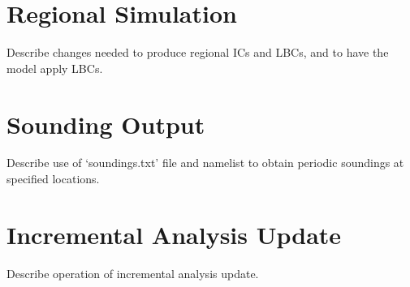 \section{Regional Simulation}
\label{sec:regional}

Describe changes needed to produce regional ICs and LBCs, and to have the model apply LBCs.


\section{Sounding Output}
\label{sec:soundings}

Describe use of `soundings.txt' file and namelist to obtain periodic soundings at specified locations.


\section{Incremental Analysis Update}
\label{sec:iau}

Describe operation of incremental analysis update.

